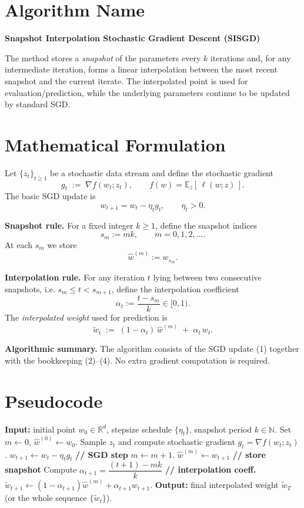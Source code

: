 \documentclass{article}
\newcommand{\E}{\mathbb{E}}
\newcommand{\R}{\mathbb{R}}
\begin{document}
\section*{Algorithm Name}
\textbf{Snapshot Interpolation Stochastic Gradient Descent (SISGD)}  

The method stores a \emph{snapshot} of the parameters every $k$ iterations and, for any intermediate iteration, forms a linear interpolation between the most recent snapshot and the current iterate. The interpolated point is used for evaluation/prediction, while the underlying parameters continue to be updated by standard SGD.

\section*{Mathematical Formulation}
Let $\{z_t\}_{t\ge1}$ be a stochastic data stream and define the stochastic gradient
\[
g_t \;:=\; \nabla f(w_t;z_t),\qquad 
f(w)=\E_{z}[\,\ell(w;z)\,].
\]
The basic SGD update is
\[
w_{t+1}=w_t-\eta_t g_t,\qquad \eta_t>0.
\tag{1}
\]

\medskip
\textbf{Snapshot rule.}  
For a fixed integer $k\ge 1$, define the snapshot indices
\[
s_m := mk,\qquad m=0,1,2,\dots .
\]
At each $s_m$ we store
\[
\widehat w^{(m)} := w_{s_m}.
\tag{2}
\]

\medskip
\textbf{Interpolation rule.}  
For any iteration $t$ lying between two consecutive snapshots, i.e. $s_m\le t < s_{m+1}$, define the interpolation coefficient
\[
\alpha_t := \frac{t-s_m}{k}\in[0,1).
\tag{3}
\]
The \emph{interpolated weight} used for prediction is
\[
\tilde w_t \;:=\;(1-\alpha_t)\,\widehat w^{(m)} \;+\; \alpha_t\, w_t .
\tag{4}
\]

\medskip
\textbf{Algorithmic summary.}  
The algorithm consists of the SGD update (1) together with the bookkeeping (2)–(4). No extra gradient computation is required.

\section*{Pseudocode}
\begin{algorithm}[H]
\caption{Snapshot Interpolation SGD (SISGD)}
\begin{algorithmic}[1]
\STATE \textbf{Input:} initial point $w_0\in\R^d$, stepsize schedule $\{\eta_t\}$, snapshot period $k\in\mathbb{N}$.
\STATE Set $m\gets 0$, $\widehat w^{(0)}\gets w_0$.
    \STATE Sample $z_t$ and compute stochastic gradient $g_t=\nabla f(w_t;z_t)$.
    \STATE $w_{t+1}\gets w_t-\eta_t g_t$   \hfill \textbf{// SGD step}
        \STATE $m\gets m+1$.
        \STATE $\widehat w^{(m)}\gets w_{t+1}$   \hfill \textbf{// store snapshot}
    \ENDIF
    \STATE Compute $\alpha_{t+1}= \dfrac{(t+1)-mk}{k}$   \hfill \textbf{// interpolation coeff.}
    \STATE $\tilde w_{t+1}\gets (1-\alpha_{t+1})\widehat w^{(m)}+\alpha_{t+1} w_{t+1}$.
\ENDFOR
\STATE \textbf{Output:} final interpolated weight $\tilde w_T$ (or the whole sequence $\{\tilde w_t\}$).
\end{algorithmic}
\end{algorithm}
\end{document}
